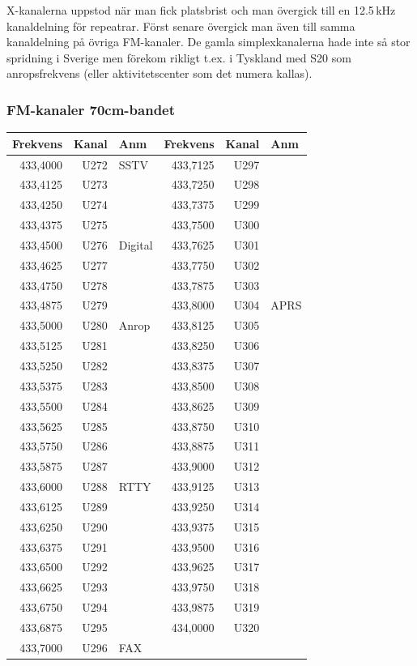 X-kanalerna uppstod när man fick platsbrist och man övergick till en 12.5\,kHz kanaldelning för repeatrar. Först senare övergick man även till samma kanaldelning på övriga FM-kanaler. De gamla simplexkanalerna hade inte så stor spridning i Sverige men förekom rikligt t.ex. i Tyskland med S20 som anropsfrekvens (eller aktivitetscenter som det numera kallas).

\clearpage
\subsubsection{FM-kanaler 70cm-bandet}

\begin{longtable}{rrl|rrl}
\textbf{Frekvens} & \textbf{Kanal} & \textbf{Anm} &  
\textbf{Frekvens} & \textbf{Kanal} & \textbf{Anm} \\ \hline

433,4000 & U272 & SSTV    & 433,7125 & U297 &      \\
433,4125 & U273 &         & 433,7250 & U298 &      \\
433,4250 & U274 &         & 433,7375 & U299 &      \\
433,4375 & U275 &         & 433,7500 & U300 &      \\
433,4500 & U276 & Digital & 433,7625 & U301 &      \\
433,4625 & U277 &         & 433,7750 & U302 &      \\
433,4750 & U278 &         & 433,7875 & U303 &      \\
433,4875 & U279 &         & 433,8000 & U304 & APRS \\
433,5000 & U280 & Anrop   & 433,8125 & U305 &      \\
433,5125 & U281 &         & 433,8250 & U306 &      \\
433,5250 & U282 &         & 433,8375 & U307 &      \\
433,5375 & U283 &         & 433,8500 & U308 &      \\
433,5500 & U284 &         & 433,8625 & U309 &      \\
433,5625 & U285 &         & 433,8750 & U310 &      \\
433,5750 & U286 &         & 433,8875 & U311 &      \\
433,5875 & U287 &         & 433,9000 & U312 &      \\
433,6000 & U288 & RTTY    & 433,9125 & U313 &      \\
433,6125 & U289 &         & 433,9250 & U314 &      \\
433,6250 & U290 &         & 433,9375 & U315 &      \\
433,6375 & U291 &         & 433,9500 & U316 &      \\
433,6500 & U292 &         & 433,9625 & U317 &      \\
433,6625 & U293 &         & 433,9750 & U318 &      \\
433,6750 & U294 &         & 433,9875 & U319 &      \\
433,6875 & U295 &         & 434,0000 & U320 &      \\
433,7000 & U296 & FAX     &          &      &      \\


\end{longtable}
